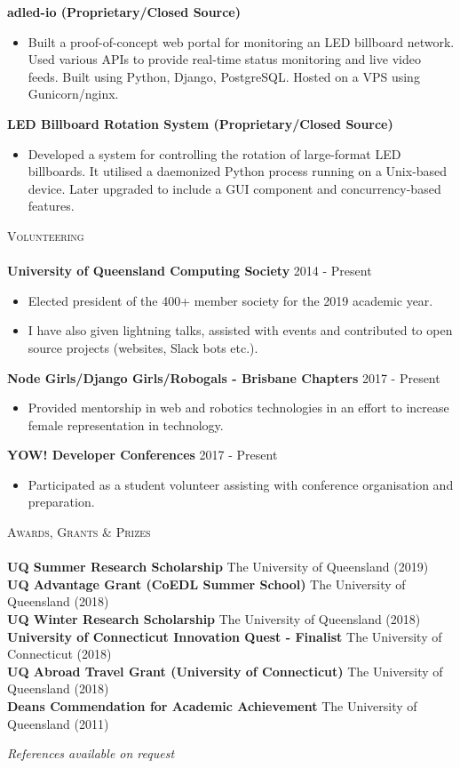 \documentclass[a4paper]{article}
\newcommand{\lineunder} {
    \vspace*{-8pt} \\
    \hspace*{-10pt} \hrulefill \\
}
\newcommand{\header} [1] {
    {\hspace*{-10pt}\vspace*{6pt} \textsc{#1}}
    \vspace*{-6pt} \lineunder
}
\newenvironment{singleitem}
{   \small
    \vspace{-2.6pt}
    \begin{itemize}
    \setlength{\itemsep}{0pt}
    \setlength{\parskip}{0pt}
    \setlength{\parsep}{0pt}   }
{\end{itemize} \vspace{-2.6pt}	}
\begin{document}
\textbf{adled-io (Proprietary/Closed Source)}
\begin{singleitem}
	\item Built a proof-of-concept web portal for monitoring an LED billboard network. Used various APIs to provide real-time status monitoring and live video feeds. Built using Python, Django, PostgreSQL. Hosted on a VPS using Gunicorn/nginx.
\end{singleitem}

\textbf{LED Billboard Rotation System (Proprietary/Closed Source)}
\begin{singleitem}
	\item Developed a system for controlling the rotation of large-format LED billboards. It utilised a daemonized Python process running on a Unix-based device. Later upgraded to include a GUI component and concurrency-based features.
\end{singleitem}

\vspace{0mm}

\header{Volunteering}
\textbf{University of Queensland Computing Society} \hfill 2014 - Present\\
\begin{singleitem}
	\item Elected president of the 400+ member society for the 2019 academic year.
	\item I have also given lightning talks, assisted with events and contributed to open source projects (websites, Slack bots etc.).
\end{singleitem}
\textbf{Node Girls/Django Girls/Robogals - Brisbane Chapters} \hfill 2017 - Present\\
\begin{singleitem}
	\item Provided mentorship in web and robotics technologies in an effort to increase female representation in technology.
\end{singleitem}
\textbf{YOW! Developer Conferences} \hfill 2017 - Present\\
\begin{singleitem}
	\item Participated as a student volunteer assisting with conference organisation and preparation.
\end{singleitem}

\header{Awards, Grants \& Prizes}
\textbf{UQ Summer Research Scholarship} \hfill The University of Queensland (2019)\\
\textbf{UQ Advantage Grant (CoEDL Summer School)} \hfill The University of Queensland (2018)\\
\textbf{UQ Winter Research Scholarship} \hfill The University of Queensland (2018)\\
\textbf{University of Connecticut Innovation Quest - Finalist} \hfill The University of Connecticut (2018)\\
\textbf{UQ Abroad Travel Grant (University of Connecticut)} \hfill The University of Queensland (2018)\\
\textbf{Dean\textquotesingle{}s Commendation for Academic Achievement} \hfill The University of Queensland (2011)\\


\vspace{3mm}
\begin{center}
\small \textit{References available on request}
\end{center}
\end{document}
